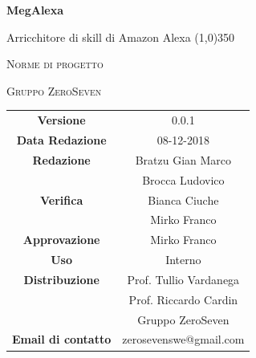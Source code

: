 \documentclass[a4paper,12pt]{article}
\author{Bratzu Gian Marco}
\date{2018-11-28}
\begin{document}
\begin{titlepage}
	\centering
	{\huge\bfseries MegAlexa\par}
	Arricchitore di skill di Amazon Alexa
	\line(1,0){350} \\
	{\scshape\LARGE Norme di progetto \par}
	\vspace{1cm}
	{\scshape Gruppo ZeroSeven \par}
	\logo
	\begin{tabular}{c|c}
		{\hfill \textbf{Versione}} 			& 0.0.1				\\
		{\hfill\textbf{Data Redazione}} 	& 08-12-2018		\\ 
		{\hfill\textbf{Redazione}} 			&  		Bratzu Gian Marco\\&Brocca Ludovico\\   
		{\hfill\textbf{Verifica}} 				&  	Bianca Ciuche\\& Mirko Franco	\\ 
		{\hfill\textbf{Approvazione}} 		&  		Mirko Franco			\\ 
		{\hfill\textbf{Uso}} 					& 		Interno		\\ 
		{\hfill\textbf{Distribuzione}} 			& 			Prof. Tullio Vardanega \\ & Prof. Riccardo Cardin \\ & Gruppo ZeroSeven		\\ 
		{\hfill\textbf{Email di contatto}} & zerosevenswe@gmail.com \\
	\end{tabular}
\end{titlepage}
	

	
	\label{LastFrontPage}
	\newpage	
	
	\pagestyle{mymain}
	\tableofcontents
	
	
				
	\label{LastPage}
\end{document}
